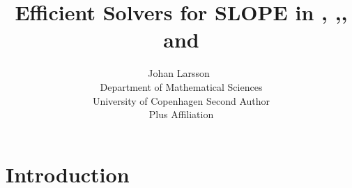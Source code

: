 \documentclass[article]{jss}
\author{Johan Larsson~\orcidlink{0000-0002-4029-5945}\\Department of Mathematical Sciences\\University of Copenhagen
   \And Second Author\\Plus Affiliation}
\title{Efficient Solvers for SLOPE in \proglang{R}, \proglang{Python},\proglang{Julia}, and \proglang{C++}}
\begin{document}
\section{Introduction}



\newpage

\begin{appendix}

\end{appendix}
\end{document}
